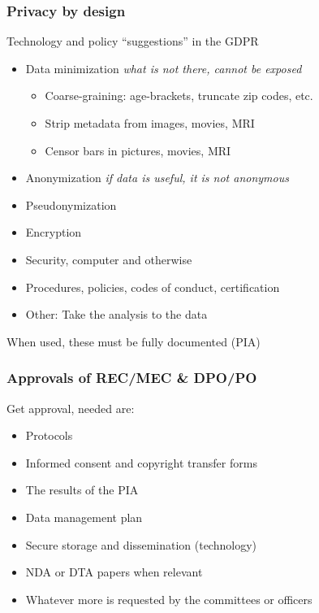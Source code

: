 \documentclass[xcolor=dvipsnames]{beamer}
\begin{document}
\begin{frame}
	\frametitle{Privacy by design}
	
	\begin{block}{Technology and policy ``suggestions'' in the GDPR {\hspace{1cm}\scriptsize\cite{IAPP2016Top10,AnitaVocht2016,AllenOvery2016GDPR,ico2017Overview}}}
	\begin{itemize}
	\item Data minimization {\hspace{2cm} \small \em what is not there, cannot be exposed}
	\begin{itemize}
	\item Coarse-graining: age-brackets, truncate zip codes, etc.
	\item Strip metadata from images, movies, MRI
	\item Censor bars in pictures, movies, MRI 
	\end{itemize}
	\item Anonymization {\hspace{2.6cm} \small \em if data is useful, it is not anonymous}
	\item Pseudonymization
	\item Encryption
	\item Security, computer and otherwise
	\item Procedures, policies, codes of conduct, certification
	\item Other: Take the analysis to the data {\scriptsize\cite{budin2015datashield}}
	\end{itemize}
	\end{block}	

	When used, these must be fully documented (PIA)

\end{frame}

\begin{frame}[label=Approvals]
	\frametitle{Approvals of REC/MEC \& DPO/PO}
	
	\begin{block}{Get approval, needed are:}
	\begin{itemize}
	\item Protocols
	\item Informed consent and copyright transfer forms
	\item The results of the PIA
	\item Data management plan {\scriptsize\cite{AcademyFinland20DMP}}
	\item Secure storage and dissemination (technology)
	\item NDA or DTA papers when relevant
	\item Whatever more is requested by the committees or officers
	\end{itemize}
	\end{block}	
\end{frame}
\end{document}
